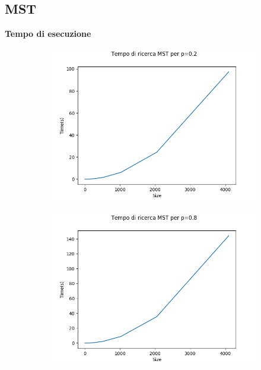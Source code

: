 \documentclass[]{article}
\begin{document}
\subsection{MST}
\textbf{Tempo di esecuzione}
\begin{figure}[H]
    \centering
    \begin{subfigure}[b]{0.45\linewidth} 
        \centering
        \includegraphics[width=\textwidth]{krusk_time_p=02}
        \label{fig:quick_casuale}
    \end{subfigure}
    \quad
    \begin{subfigure}[b]{0.45\linewidth}
        \centering
        \includegraphics[width=\textwidth]{krusk_time_p=08}
        \label{fig:quick_best}
    \end{subfigure}
\end{figure}
\end{document}
